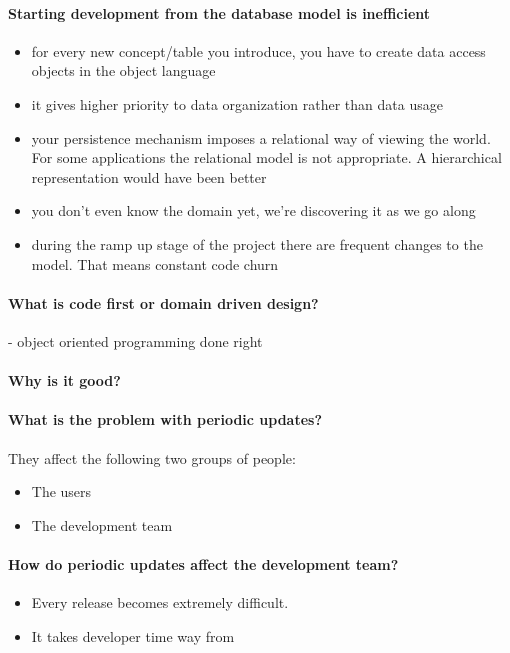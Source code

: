 \documentclass{article}
\begin{document}
\paragraph{Starting development from the database model is inefficient}
\begin{itemize} 
\item for every new concept/table you introduce, you have to create
  data access objects in the object language

\item it gives higher priority to data organization rather than data
  usage
\item your persistence mechanism imposes a relational way of viewing
  the world. For some applications the relational model is not
  appropriate. A hierarchical representation would have been better

\item you don't even know the domain yet, we're discovering it as we
  go along
\item during the ramp up stage of the project there are frequent
  changes to the model. That means constant code churn
\end{itemize}

\paragraph{What is code first or domain driven design?}
- object oriented programming done right

\paragraph{Why is it good?}




\paragraph{What is the problem with periodic updates?}

They affect the following two groups of people:
\begin{itemize}
  \item The users
  \item The development team
\end{itemize}

\paragraph{How do periodic updates affect the development team?}
\begin{itemize}
  \item Every release becomes extremely difficult.
  \item It takes developer time way from
\end{itemize}
\end{document}
